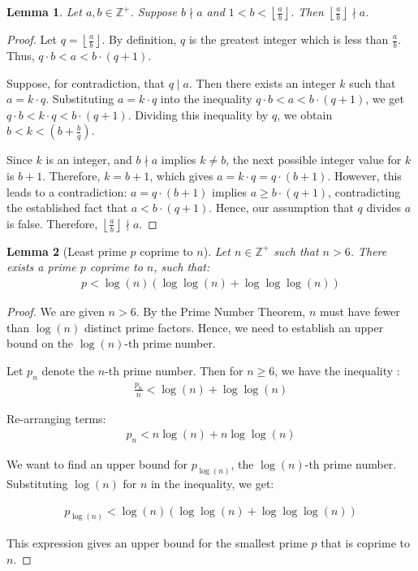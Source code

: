 \documentclass{article}
\theoremstyle{plain}
\theoremstyle{definition}
\newtheorem{lemma}{Lemma}
\newcommand{\Z}{\mathbb{Z}}
\newcommand{\primep}{p}
\begin{document}
\begin{lemma} \label{lemma:floornondivisor}
\textit{Let $a,b \in \Z^{+}$. Suppose \(b \nmid a\) and \( 1 < b < \left\lfloor \frac{a}{b} \right\rfloor \). Then \(\left\lfloor \frac{a}{b} \right\rfloor \nmid a\).}
\end{lemma}
\begin{proof}
Let \(q = \left\lfloor \frac{a}{b} \right\rfloor\). By definition, \(q\) is the greatest integer which is less than \(\frac{a}{b}\). Thus, \(q \cdot b < a < b \cdot (q + 1)\).

Suppose, for contradiction, that \(q \mid a\). Then there exists an integer \(k\) such that \(a = k \cdot q\). Substituting \(a = k \cdot q\) into the inequality \(q \cdot b < a < b \cdot (q + 1) \), we get \(q \cdot b < k \cdot q < b \cdot (q + 1) \). Dividing this inequality by \(q\), we obtain \(b < k < (b + \frac{b}{q})\).

Since \(k\) is an integer, and \(b \nmid a\) implies \(k \neq b\), the next possible integer value for \(k\) is \(b + 1\). Therefore, \(k = b + 1\), which gives \(a = k \cdot q = q \cdot (b + 1)\). However, this leads to a contradiction: \(a = q \cdot (b + 1) \) implies \(a \geq b \cdot (q + 1) \), contradicting the established fact that \(a < b \cdot (q + 1) \). Hence, our assumption that \(q\) divides \(a\) is false. Therefore, \(\left\lfloor \frac{a}{b} \right\rfloor \nmid a\).
\end{proof}

\begin{lemma}[Least prime $\primep$ coprime to $n$] \label{lemma:leastcoprime}
\textit{Let $n \in \mathbb{Z}^+$ such that $n > 6$. There exists a prime $\primep$ coprime to $n$, such that:}
\begin{align*}
    \primep < \log(n) \left( \log\log(n) + \log\log\log(n) \right)
\end{align*}
\end{lemma}
\begin{proof}
We are given $n > 6$. By the Prime Number Theorem, $n$ must have fewer than $\log(n)$ distinct prime factors. Hence, we need to establish an upper bound on the $\log(n)$-th prime number.

Let $p_n$ denote the $n$-th prime number. Then for $n \geq 6$, we have the inequality \cite{rosser1941primebounds}:
\begin{align}
    \frac{\primep_n}{n} < \log(n) + \log\log(n)
\end{align}

Re-arranging terms:
\begin{align}
    \primep_n < n \log(n) + n \log\log(n)
\end{align}

We want to find an upper bound for $\primep_{\log(n)}$, the $\log(n)$-th prime number. Substituting $\log(n)$ for $n$ in the inequality, we get:

\begin{align}
\primep_{\log(n)} < \log(n) \left( \log\log (n) + \log\log\log(n) \right)
\end{align}

This expression gives an upper bound for the smallest prime $\primep$ that is coprime to $n$.
\end{proof}
\end{document}
